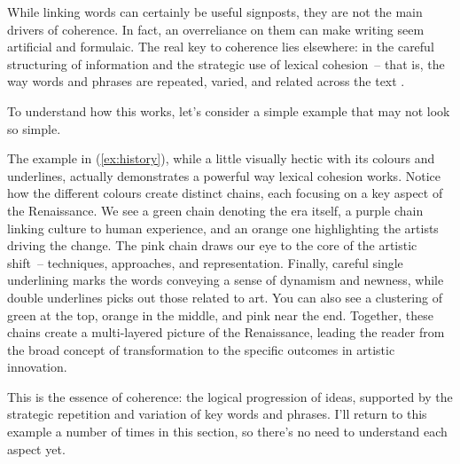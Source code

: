 While linking words can certainly be useful signposts, they are not the main drivers of coherence. In fact, an overreliance on them can make writing seem artificial and formulaic. The real key to coherence lies elsewhere: in the careful structuring of information and the strategic use of lexical cohesion~-- that is, the way words and phrases are repeated, varied, and related across the text \citep{HallidayHasan1976}.

To understand how this works, let's consider a simple example that may not look so simple.

\label{ex:history}
\z


The example in (\ref{ex:history}), while a little visually hectic with its colours and underlines, actually demonstrates a powerful way lexical cohesion works. Notice how the different colours create distinct chains, each focusing on a key aspect of the Renaissance. We see a green chain denoting the era itself, a purple chain linking culture to human experience, and an orange one highlighting the artists driving the change.  The pink chain draws our eye to the core of the artistic shift~-- techniques, approaches, and representation.  Finally, careful single underlining marks the words conveying a sense of dynamism and newness, while double underlines picks out those related to art. You can also see a clustering of green at the top, orange in the middle, and pink near the end. Together, these chains create a multi-layered picture of the Renaissance, leading the reader from the broad concept of transformation to the specific outcomes in artistic innovation.

This is the essence of coherence: the logical progression of ideas, supported by the strategic repetition and variation of key words and phrases. I'll return to this example a number of times in this section, so there's no need to understand each aspect yet.

